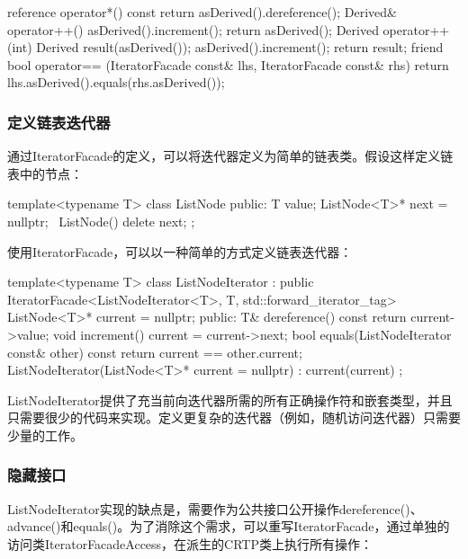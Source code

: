 \begin{cpp}
reference operator*() const {
	return asDerived().dereference();
}
Derived& operator++() {
	asDerived().increment();
	return asDerived();
}
Derived operator++(int) {
	Derived result(asDerived());
	asDerived().increment();
	return result;
}
friend bool operator== (IteratorFacade const& lhs,
IteratorFacade const& rhs) {
	return lhs.asDerived().equals(rhs.asDerived());
}
\end{cpp}

\subsubsection{定义链表迭代器}

通过IteratorFacade的定义，可以将迭代器定义为简单的链表类。假设这样定义链表中的节点：

\begin{cpp}
template<typename T>
class ListNode {
	public:
	T value;
	ListNode<T>* next = nullptr;
	~ListNode() { delete next; }
};
\end{cpp}

使用IteratorFacade，可以以一种简单的方式定义链表迭代器：

\begin{cpp}
template<typename T>
class ListNodeIterator
: public IteratorFacade<ListNodeIterator<T>, T,
std::forward_iterator_tag> {
	ListNode<T>* current = nullptr;
	public:
	T& dereference() const {
		return current->value;
	}
	void increment() {
		current = current->next;
	}
	bool equals(ListNodeIterator const& other) const {
		return current == other.current;
	}
	ListNodeIterator(ListNode<T>* current = nullptr) : current(current) { }
};
\end{cpp}

ListNodeIterator提供了充当前向迭代器所需的所有正确操作符和嵌套类型，并且只需要很少的代码来实现。定义更复杂的迭代器（例如，随机访问迭代器）只需要少量的工作。

\subsubsection{隐藏接口}

ListNodeIterator实现的缺点是，需要作为公共接口公开操作dereference()、advance()和equals()。为了消除这个需求，可以重写IteratorFacade，通过单独的访问类IteratorFacadeAccess，在派生的CRTP类上执行所有操作：

